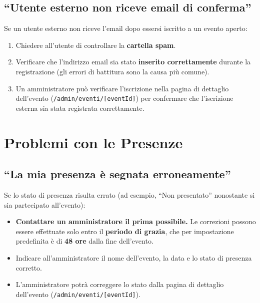 \documentclass[a4paper,11pt,oneside]{book}
\newcommand{\percorso}[1]{\textcolor{namoCyan}{\texttt{#1}}}
\begin{document}
\subsection{``Utente esterno non riceve email di conferma''}

Se un utente esterno non riceve l'email dopo essersi iscritto a un evento aperto:

\begin{enumerate}[leftmargin=1.5em]
  \item Chiedere all'utente di controllare la \textbf{cartella spam}.
  \item Verificare che l'indirizzo email sia stato \textbf{inserito correttamente} durante la registrazione (gli errori di battitura sono la causa pi\`u comune).
  \item Un amministratore pu\`o verificare l'iscrizione nella pagina di dettaglio dell'evento (\percorso{/admin/eventi/[eventId]}) per confermare che l'iscrizione esterna sia stata registrata correttamente.
\end{enumerate}

\section{Problemi con le Presenze}
\label{sec:problemi-presenze}

\subsection{``La mia presenza \`e segnata erroneamente''}

Se lo stato di presenza risulta errato (ad esempio, ``Non presentato'' nonostante si sia partecipato all'evento):

\begin{itemize}[leftmargin=1.5em]
  \item \textbf{Contattare un amministratore il prima possibile.} Le correzioni possono essere effettuate solo entro il \textbf{periodo di grazia}, che per impostazione predefinita \`e di \textbf{48 ore} dalla fine dell'evento.
  \item Indicare all'amministratore il nome dell'evento, la data e lo stato di presenza corretto.
  \item L'amministratore potr\`a correggere lo stato dalla pagina di dettaglio dell'evento (\percorso{/admin/eventi/[eventId]}).
\end{itemize}
\end{document}
